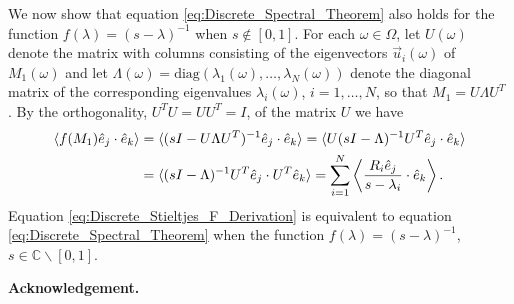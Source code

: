 \documentclass{cmslatex}
\begin{document}
We now show that equation \eqref{eq:Discrete_Spectral_Theorem} also
holds for the function $f(\lambda)=(s-\lambda)^{-1}$ when $s\not\in[0,1]$. For each
$\omega\in\Omega$, let $U(\omega)$ denote the matrix with columns consisting of the
eigenvectors $\vec{u}_i(\omega)$ of $M_1(\omega)$ and let
$\Lambda(\omega)=\text{diag}(\lambda_1(\omega),\ldots,\lambda_N(\omega))$ denote the diagonal matrix of the
corresponding eigenvalues $\lambda_i(\omega)$, $i=1,\ldots,N$, so that $M_1=U\Lambda U^T$
\cite{Halmos-1958}. By the orthogonality, $U^TU=UU^T=I$, of the matrix
$U$ we have   
%
\begin{align}\label{eq:Discrete_Stieltjes_F_Derivation}
     \langle f(M_1)\hat{e}_j\cdot\hat{e}_k\rangle
        &=\langle(sI-U\Lambda U^T)^{-1}\hat{e}_j\cdot\hat{e}_k\rangle
        = \langle U(sI-\Lambda)^{-1}U^T\hat{e}_j\cdot\hat{e}_k\rangle\\
        &=\langle(sI-\Lambda)^{-1}U^T\hat{e}_j\cdot U^T\hat{e}_k\rangle
        =\sum_{i=1}^N\left\langle
          \frac{R_i\hat{e}_j}{s-\lambda_i}\cdot\hat{e}_k
          \right\rangle.               
        \notag
\end{align}
%
Equation \eqref{eq:Discrete_Stieltjes_F_Derivation} is equivalent to equation
\eqref{eq:Discrete_Spectral_Theorem} when the function
$f(\lambda)=(s-\lambda)^{-1}$, $s\in\mathbb{C}\backslash[0,1]$.








\medskip

{\bf Acknowledgement.}
\medskip



\end{document}
